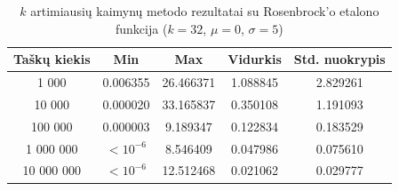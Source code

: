 \begin{table}[H]
    \centering
    \begin{tabular}{|c|c|c|c|c|}
        \hline
        \textbf{Taškų kiekis} & \textbf{Min} & \textbf{Max} & \textbf{Vidurkis} & \textbf{Std. nuokrypis} \\ \hline
        1 000        & 0.006355 & 26.466371 & 1.088845 & 2.829261 \\ \hline
        10 000       & 0.000020 & 33.165837 & 0.350108 & 1.191093 \\ \hline
        100 000      & 0.000003 & 9.189347 & 0.122834 & 0.183529 \\ \hline
        1 000 000    & $<10^{-6}$ & 8.546409 & 0.047986 & 0.075610 \\ \hline
        10 000 000   & $<10^{-6}$ & 12.512468 & 0.021062 & 0.029777 \\ \hline
    \end{tabular}
    \caption{$k$ artimiausių kaimynų metodo rezultatai su Rosenbrock'o etalono funkcija ($k = 32$, $\mu = 0$, $\sigma = 5$)}
\end{table}